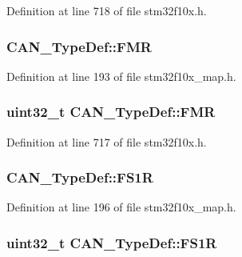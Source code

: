 Definition at line 718 of file stm32f10x.\+h.

\subsubsection[{\texorpdfstring{F\+MR}{FMR}}]{ C\+A\+N\+\_\+\+Type\+Def\+::\+F\+MR}\hypertarget{struct_c_a_n___type_def_affc66d56e31f75c2c511f268500c9821}{}\label{struct_c_a_n___type_def_affc66d56e31f75c2c511f268500c9821}


Definition at line 193 of file stm32f10x\+\_\+map.\+h.

\subsubsection[{\texorpdfstring{F\+MR}{FMR}}]{ {\bf uint32\+\_\+t} C\+A\+N\+\_\+\+Type\+Def\+::\+F\+MR}\hypertarget{struct_c_a_n___type_def_a1a6a0f78ca703a63bb0a6b6f231f612f}{}\label{struct_c_a_n___type_def_a1a6a0f78ca703a63bb0a6b6f231f612f}


Definition at line 717 of file stm32f10x.\+h.

\subsubsection[{\texorpdfstring{F\+S1R}{FS1R}}]{ C\+A\+N\+\_\+\+Type\+Def\+::\+F\+S1R}\hypertarget{struct_c_a_n___type_def_a4da36d695b16468f85259dbf5a8655f5}{}\label{struct_c_a_n___type_def_a4da36d695b16468f85259dbf5a8655f5}


Definition at line 196 of file stm32f10x\+\_\+map.\+h.

\subsubsection[{\texorpdfstring{F\+S1R}{FS1R}}]{ {\bf uint32\+\_\+t} C\+A\+N\+\_\+\+Type\+Def\+::\+F\+S1R}\hypertarget{struct_c_a_n___type_def_ac6296402924b37966c67ccf14a381976}{}\label{struct_c_a_n___type_def_ac6296402924b37966c67ccf14a381976}


